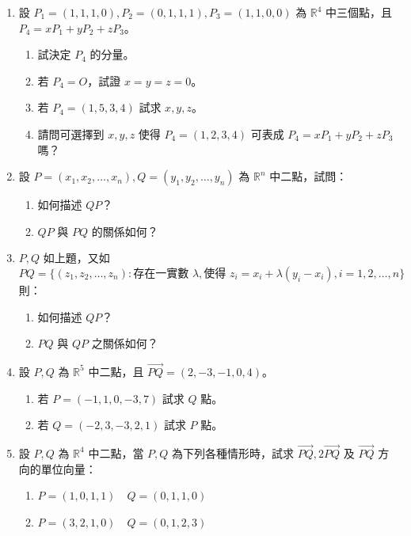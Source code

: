 \begin{enumerate}[label=\arabic*., leftmargin=2em]
  \item 設 $P_1=(1, 1, 1, 0), P_2=(0, 1, 1, 1), P_3=(1, 1, 0, 0)$ 為 $\mathbb{R}^4$ 中三個點，且 $P_4 = x P_1 + y P_2 + z P_3$。
  \begin{enumerate}[label=(\alph*)]
    \item 試決定 $P_4$ 的分量。
    \item 若 $P_4=O$，試證 $x=y=z=0$。
    \item 若 $P_4=(1, 5, 3, 4)$ 試求 $x, y, z$。
    \item 請問可選擇到 $x, y, z$ 使得 $P_4=(1, 2, 3, 4)$ 可表成 $P_4 = x P_1 + y P_2 + z P_3$ 嗎？
  \end{enumerate}

  \item[\textbf{*9.}] 設 $P=(x_1, x_2, \dots, x_n), Q=(y_1, y_2, \dots, y_n)$ 為 $\mathbb{R}^n$ 中二點，試問：
  \begin{enumerate}[label=(\alph*)]
    \item 如何描述 $QP$？
    \item $QP$ 與 $PQ$ 的關係如何？
  \end{enumerate}

  \item $P, Q$ 如上題，又如
  \[ PQ = \{ (z_1, z_2, \dots, z_n) : \text{存在一實數 } \lambda, \text{使得 } z_i = x_i + \lambda(y_i - x_i), i=1, 2, \dots, n \} \]
  則：
  \begin{enumerate}[label=(\alph*)]
    \item 如何描述 $QP$？
    \item $PQ$ 與 $QP$ 之關係如何？
  \end{enumerate}

  \item 設 $P, Q$ 為 $\mathbb{R}^5$ 中二點，且 $\vec{PQ} = (2, -3, -1, 0, 4)$。
  \begin{enumerate}[label=(\alph*)]
    \item 若 $P=(-1, 1, 0, -3, 7)$ 試求 $Q$ 點。
    \item 若 $Q=(-2, 3, -3, 2, 1)$ 試求 $P$ 點。
  \end{enumerate}

  \item 設 $P, Q$ 為 $\mathbb{R}^4$ 中二點，當 $P, Q$ 為下列各種情形時，試求 $\vec{PQ}, 2\vec{PQ}$ 及 $\vec{PQ}$ 方向的單位向量：
  \begin{enumerate}[label=(\alph*)]
    \item $P=(1, 0, 1, 1) \quad Q=(0, 1, 1, 0)$
    \item $P=(3, 2, 1, 0) \quad Q=(0, 1, 2, 3)$
  \end{enumerate}


\end{enumerate}

